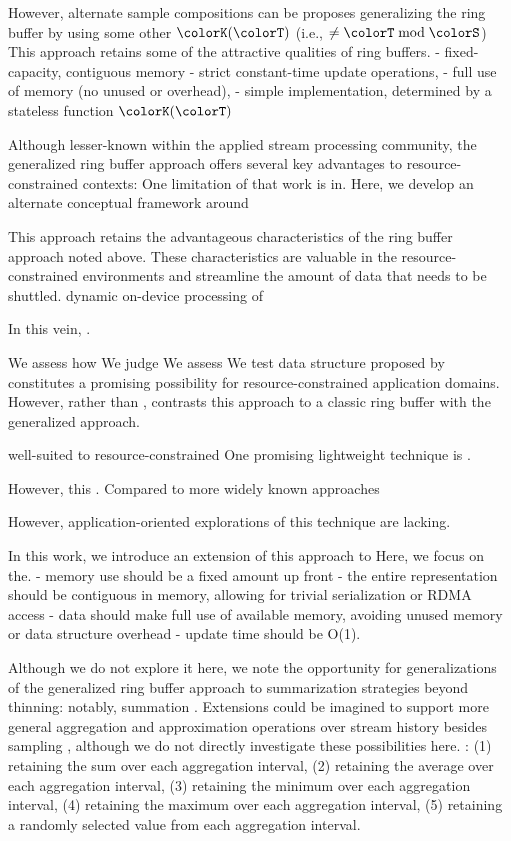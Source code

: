 However, alternate sample compositions can be
\citet{gunther2014compressing} proposes generalizing the ring buffer by using some other $\colorK(\colorT)$ (i.e., $\neq \colorT \bmod \colorS$)
This approach retains some of the attractive qualities of ring buffers.
- fixed-capacity, contiguous memory
- strict constant-time update operations,
- full use of memory (no unused or overhead),
- simple implementation, determined by a stateless function $\colorK(\colorT)$

Although lesser-known within the applied stream processing community, the generalized ring buffer approach offers several key advantages to resource-constrained contexts:
One limitation of that work is in.
Here, we develop an alternate conceptual framework around

This approach retains the advantageous characteristics of the ring buffer approach noted above.
These characteristics are valuable in the resource-constrained environments and streamline the amount of data that needs to be shuttled.
 dynamic on-device processing of

In this vein,  .

We assess how
We judge
We assess
We test
 data structure proposed by  constitutes a promising possibility for resource-constrained application domains.
However, rather than ,
 contrasts this approach to a classic ring buffer with the generalized approach.


well-suited to resource-constrained
One promising lightweight technique is  .


However, this .
Compared to more widely known approaches

However, application-oriented explorations of this technique are lacking.

In this work, we introduce an extension of this approach to
Here, we focus on the.
- memory use should be a fixed amount up front
- the entire representation should be contiguous in memory, allowing for trivial serialization or RDMA access
- data should make full use of available memory, avoiding unused memory or data structure overhead
- update time should be O(1).

Although we do not explore it here, we note the opportunity for generalizations of the generalized ring buffer approach to summarization strategies beyond thinning: notably, summation \citep{gunther2014compressing}.
Extensions could be imagined to support more general aggregation and approximation operations over stream history besides sampling \citep{schoellhammer2024lightweight}, although we do not directly investigate these possibilities here.
\citet{gunther2014compressing}:
(1) retaining the sum over each aggregation interval,
(2) retaining the average over each aggregation interval,
(3) retaining the minimum over each aggregation interval,
(4) retaining the maximum over each aggregation interval,
(5) retaining a randomly selected value from each aggregation interval.

